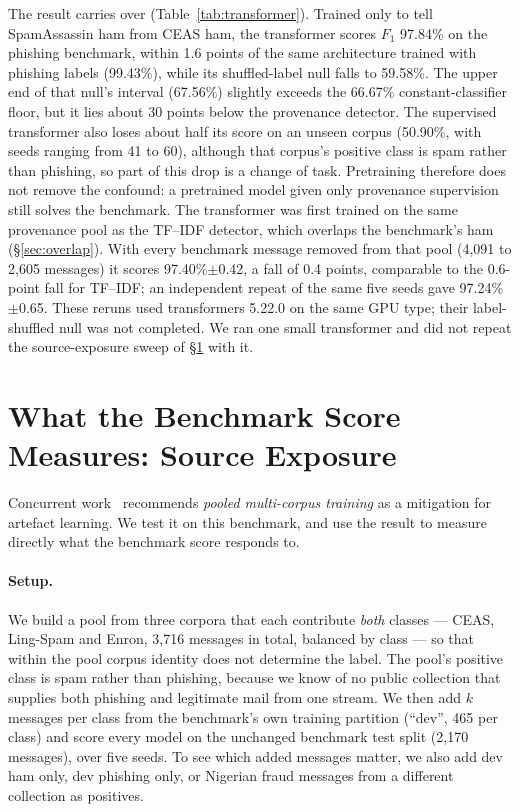 \documentclass[twoside,11pt]{article}
\begin{document}
The result carries over (Table~\ref{tab:transformer}). Trained only to tell
SpamAssassin ham from CEAS ham, the transformer scores $F_1$ 97.84\% on the
phishing benchmark, within 1.6 points of the same architecture trained with
phishing labels (99.43\%), while its shuffled-label null falls to 59.58\%. The
upper end of that null's interval (67.56\%) slightly exceeds the 66.67\%
constant-classifier floor, but it lies about 30 points below the provenance
detector. The supervised transformer also loses about half its score on an unseen
corpus (50.90\%, with seeds ranging from 41 to 60), although that corpus's
positive class is spam rather than phishing, so part of this drop is a change
of task. Pretraining therefore does
not remove the confound: a pretrained model given only provenance supervision
still solves the benchmark. The transformer was first trained on the same
provenance pool as the TF--IDF detector, which overlaps the benchmark's ham
(\S\ref{sec:overlap}). With every benchmark message removed from that pool
(4{,}091 to 2{,}605 messages) it scores 97.40\%$\pm$0.42, a fall of 0.4
points, comparable to the 0.6-point fall for TF--IDF; an independent repeat of
the same five seeds gave 97.24\%$\pm$0.65. These reruns used transformers
5.22.0 on the same GPU type; their label-shuffled null was not completed. We ran one small
transformer and did not repeat the source-exposure sweep of
\S\ref{sec:pooling} with it.

\section{What the Benchmark Score Measures: Source Exposure}
\label{sec:pooling}

Concurrent work~\citep{fragility2026} recommends \emph{pooled multi-corpus
training} as a mitigation for artefact learning. We test it on this
benchmark, and use the result to measure directly what the benchmark score
responds to.

\paragraph{Setup.} We build a pool from three corpora that each contribute
\emph{both} classes --- CEAS, Ling-Spam and Enron, 3{,}716 messages in total,
balanced by class --- so that within the pool corpus identity does not
determine the label. The pool's positive class is spam rather than phishing,
because we know of no public collection that supplies both phishing and
legitimate mail from one stream. We then add $k$ messages per class from the benchmark's own
training partition (``dev'', 465 per class) and score every model on the
unchanged benchmark test split (2{,}170 messages), over five seeds. To see
which added messages matter, we also add dev ham only, dev phishing only, or
Nigerian fraud messages from a different collection as positives.
\end{document}
